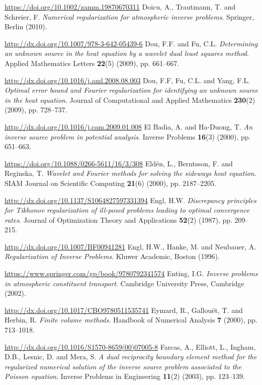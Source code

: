 \begin{thebibliography}{301}
\url{https://doi.org/10.1002/zamm.19870670311}
%
%
 Doicu, A., Trautmann, T. and Schreier, F. {\it Numerical regularization for atmospheric inverse problems}. Springer, Berlin (2010). 

\url{http://dx.doi.org/10.1007/978-3-642-05439-6}
%
%
 Dou, F.F. and Fu, C.L. {\it Determining an unknown source in the heat equation by a wavelet dual least squares method}. Applied Mathematics Letters {\bf 22}(5) (2009), pp. 661--667.

\url{http://dx.doi.org/10.1016/j.aml.2008.08.003}
%
 Dou, F.F, Fu, C.L. and Yang, F.L. {\it Optimal error bound and Fourier regularization for identifying an unknown source in the heat equation}. Journal of Computational and Applied Mathematics {\bf 230}(2) (2009), pp. 728--737.

\url{http://dx.doi.org/10.1016/j.cam.2009.01.008}
%
%
 El Badia, A. and Ha-Duong, T. {\it An inverse source problem in potential analysis}. Inverse Problems {\bf 16}(3) (2000), pp. 651--663.

\url{https://doi.org/10.1088/0266-5611/16/3/308}
%
 Eld\'en, L., Berntsson, F. and Reginska, T. {\it Wavelet and Fourier methods for solving the sideways heat equation}. SIAM Journal on Scientific Computing {\bf 21}(6) (2000), pp. 2187--2205.

\url{http://dx.doi.org/10.1137/S1064827597331394}
%
%
 Engl, H.W. {\it Discrepancy principles for Tikhonov regularization of ill-posed problems leading to optimal convergence rates}. Journal of Optimization Theory and Applications {\bf 52}(2) (1987), pp. 209--215.

\url{http://dx.doi.org/10.1007/BF00941281}
%
 Engl, H.W., Hanke, M. and Neubauer, A. {\it Regularization of Inverse Problems}. Kluwer Academic, Boston (1996). 

\url{https://www.springer.com/gp/book/9780792341574}
%
%
 Enting, I.G. {\it Inverse problems in atmospheric constituent transport}. Cambridge University Press, Cambridge (2002). 

\url{http://dx.doi.org/10.1017/CBO9780511535741}
%
%
 Eymard, R., Gallou\"et, T. and Herbin, R. {\it Finite volume methods}. Handbook of Numerical Analysis {\bf 7} (2000), pp. 713--1018.

\url{http://dx.doi.org/10.1016/S1570-8659(00)07005-8}
%
%
 Farcas, A., Elliott, L., Ingham, D.B., Lesnic, D. and Mera, S. {\it A dual reciprocity boundary element method for the regularized numerical solution of the inverse source problem associated to the Poisson equation}. Inverse Problems in Engineering {\bf 11}(2) (2003), pp. 123--139.


\end{thebibliography}
